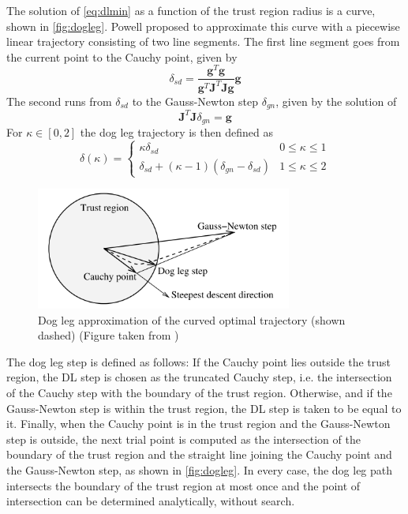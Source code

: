 The solution of \autoref{eq:dlmin} as a function of the trust region radius is a curve, shown in \autoref{fig:dogleg}. Powell \cite{powell1970hybrid} proposed to approximate this curve with a piecewise linear trajectory consisting of two line segments. The first line segment goes from the current point to the Cauchy point, given by
\begin{equation}
  \delta_{sd} = \frac{\mathbf{g}^T\mathbf{g}}{\mathbf{g}^T\mathbf{J}^T\mathbf{J}\mathbf{g}} \mathbf{g}
\end{equation}
The second runs from $\delta_{sd}$ to the Gauss-Newton step $\delta_{gn}$, given by the solution of
\begin{equation}
  \mathbf{J}^T\mathbf{J} \delta_{gn} = \mathbf{g}
  \label{eq:dlgn}
\end{equation}
For $\kappa \in [0, 2]$ the dog leg trajectory is then defined as
\begin{equation}
  \delta(\kappa) = 
    \begin{cases}
      \kappa \delta_{sd} & 0 \le \kappa \le 1 \\
      \delta_{sd} + (\kappa -1)(\delta_{gn} - \delta_{sd}) & 1 \le \kappa \le 2
    \end{cases}
\end{equation}

\begin{figure}[H]
  \centering
  \includegraphics[width=0.75\textwidth]{images/dogleg}
  \caption{Dog leg approximation of the curved optimal trajectory (shown dashed) (Figure taken from \cite{Lourakis2005})}
  \label{fig:dogleg}
\end{figure}

The dog leg step is defined as follows: If the Cauchy point lies outside the trust region, the \ac{DL} step is chosen as the truncated Cauchy step, i.e. the intersection of the Cauchy step with the boundary of the trust region. Otherwise, and if the Gauss-Newton step is within the trust region, the \ac{DL} step is taken to be equal to it. Finally, when the Cauchy point is in the trust region and the Gauss-Newton step is outside, the next trial point is computed as the intersection of the boundary of the trust region and the straight line joining the Cauchy point and the Gauss-Newton step, as shown in \autoref{fig:dogleg}. In every case, the dog leg path intersects the boundary of the trust region at most once and the point of intersection can be determined analytically, without search.\\

